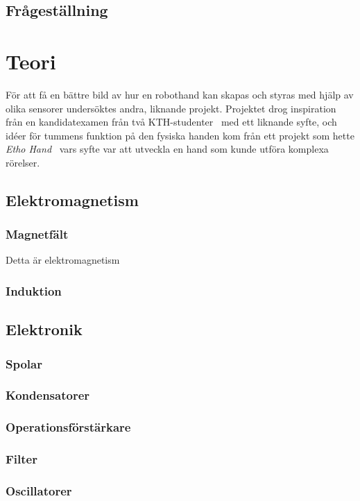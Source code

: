 \documentclass[a4paper]{article}
\begin{document}
\begin{sloppypar}
    \subsection{Frågeställning}

    \section{Teori}
    För att få en bättre bild av hur en robothand kan skapas och styras med hjälp av olika sensorer undersöktes andra, liknande projekt.
    Projektet drog inspiration från en kandidatexamen från två KTH-studenter~\cite{KTHhand} med ett liknande syfte, och
    idéer för tummens funktion på den fysiska handen kom från ett projekt som hette \textit{Etho Hand}~\cite{EthoHand}
    vars syfte var att utveckla en hand som kunde utföra komplexa rörelser.


    \subsection{Elektromagnetism}
    \subsubsection{Magnetfält}
    Detta är elektromagnetism
    \subsubsection{Induktion}

    \subsection{Elektronik}
    \subsubsection{Spolar}
    \subsubsection{Kondensatorer}
    \subsubsection{Operationsförstärkare}
    \subsubsection{Filter}
    \subsubsection{Oscillatorer}

\end{sloppypar}
\end{document}
